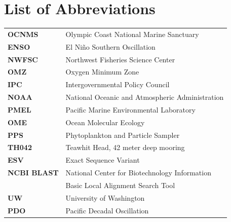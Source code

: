 \documentclass[12pt,twoside]{reedthesis}
\begin{document}
    \chapter*{List of Abbreviations}

	\begin{table}[h]
	\centering %
	\begin{tabular}{ll}
		\textbf{OCNMS}  	&  Olympic Coast National Marine Sanctuary \\
		\textbf{ENSO}  	&  El Ni\~{n}o Southern Oscillation \\
		\textbf{NWFSC} & Northwest Fisheries Science Center \\
		\textbf{OMZ}  	&  Oxygen Minimum Zone \\
		\textbf{IPC}  	&  Intergovernmental Policy Council \\
		\textbf{NOAA}  	&  National Oceanic and Atmospheric Administration \\
		\textbf{PMEL}  	&  Pacific Marine Environmental Laboratory \\
		\textbf{OME}  	&  Ocean Molecular Ecology \\
		\textbf{PPS}  	&  Phytoplankton and Particle Sampler \\
		\textbf{TH042}  	&  Teawhit Head, 42 meter deep mooring \\
		\textbf{ESV}  	&  Exact Sequence Variant \\
		\textbf{NCBI BLAST}  	&  National Center for Biotechnology Information \\ 
		& Basic Local Alignment Search Tool  \\
		\textbf{UW}  	&  University of Washington  \\ 
		\textbf{PDO}  	&  Pacific Decadal Oscillation \\
	\end{tabular}
	\end{table}
	

    \tableofcontents
    \listoftables
    \listoffigures

\end{document}
